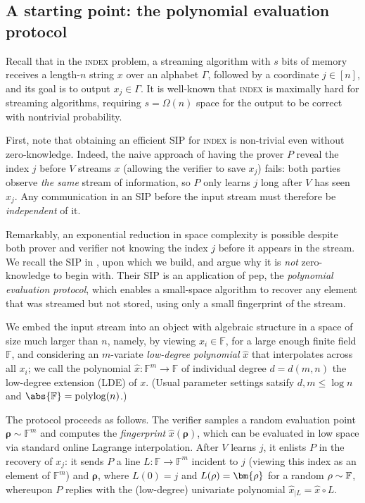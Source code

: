 \documentclass[10pt,a4paper]{article}
\theoremstyle{definition}
\newcommand{\field}{\mathbb{F}}
\newcommand{\polylog}{\operatorname{polylog}}
\newcommand{\indexproblem}{\normalfont\textsc{index}\xspace}
\newcommand{\pepprotocol}{\textsf{pep}\xspace}
\newcommand{\dimension}{m}
\newcommand{\degree}{d}
\newcommand{\fingerprinttuple}{\bm{\rho}}
\renewcommand{\line}{L}
\newcommand{\alphabet}{\Gamma}
\def\rfe#1{
    \ifnum#1=1
        \rho
    \else
    \ifnum#1=2
        \sigma
    \else
    \fi\fi
}
\begin{document}
      
\subsection{A starting point: the polynomial evaluation protocol}
\label{sec-to:pep}

    Recall that in the \indexproblem problem, a streaming algorithm with $s$ bits of memory receives a length-$n$ string $x$ over an alphabet $\alphabet$, followed by a coordinate $j \in [n]$, and its goal is to output $x_j \in \alphabet$. It is well-known that \indexproblem is maximally hard for streaming algorithms, requiring $s = \Omega(n)$ space for the output to be correct with nontrivial probability.
    
    First, note that obtaining an efficient SIP for \indexproblem is non-trivial even without zero-knowledge. Indeed, the naive approach of having the prover $P$ reveal the index $j$ before $V$ streams $x$ (allowing the verifier to save $x_j$) fails: both parties observe \emph{the same} stream of information, so $P$ only learns $j$ long after $V$ has seen $x_j$. Any communication in an SIP before the input stream must therefore be \emph{independent} of it.
    
    Remarkably, an exponential reduction in space complexity is possible despite both prover and verifier not knowing the index $j$ before it appears in the stream. We recall the SIP in \cite{CCMTV19}, upon which we build, and argue why it is \emph{not} zero-knowledge to begin with. Their SIP is an application of \pepprotocol, the \emph{polynomial evaluation protocol}, which enables a small-space algorithm to recover any element that was streamed but not stored, using only a small fingerprint of the stream.

    We embed the input stream into an object with algebraic structure in a space of size much larger than $n$, namely, by viewing $x_i \in \field$, for a large enough finite field $\field$, and considering an $\dimension$-variate \emph{low-degree polynomial} $\hat x$ that interpolates across all $x_i$; we call the polynomial $\hat x: \field^\dimension \to \field$ of individual degree $\degree = \degree(\dimension, n)$ the low-degree extension (LDE) of $x$. (Usual parameter settings satsify $\degree, \dimension \leq \log n$ and $\abs{\field} = \polylog(n)$.)
    
    The protocol proceeds as follows. The verifier samples a random evaluation point $\fingerprinttuple \sim \field^\dimension$ and computes the \emph{fingerprint} $\hat x(\fingerprinttuple)$, which can be evaluated in low space via standard online Lagrange interpolation. After $V$ learns $j$, it enlists $P$ in the recovery of $x_j$: it sends $P$ a line $\line: \field \to \field^\dimension$ incident to $j$ (viewing this index as an element of $\field^\dimension$) and $\fingerprinttuple$, where $\line(0) = j$ and $\line(\rfe1) = \fingerprinttuple$ for a random $\rfe1 \sim \field$, whereupon $P$ replies with the (low-degree) univariate polynomial $\hat x_{|\line} = \hat x \circ \line$.
    
\end{document}
